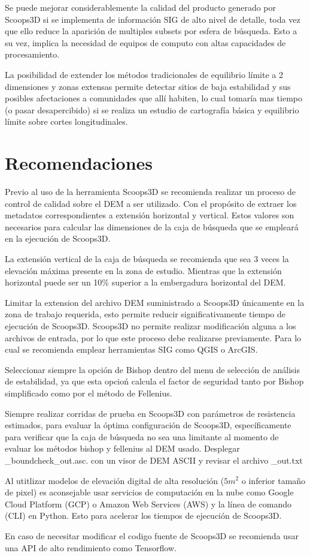 Se puede mejorar considerablemente la calidad del producto generado por Scoops3D si se implementa de informaci\'on SIG de alto nivel de detalle, toda vez que ello reduce la aparici\'on de multiples subsets por esfera de b\'usqueda. Esto a su vez, implica la necesidad de equipos de computo con altas capacidades de procesamiento.


La posibilidad de extender los m\'etodos tradicionales de equilibrio l\'imite a 2 dimensiones y zonas extensas permite detectar sitios de baja estabilidad y sus posibles afectaciones a comunidades que all\'i habiten, lo cual tomar\'ia mas tiempo (o pasar desapercibido) si se realiza un estudio de cartograf\'ia b\'asica y equilibrio l\'imite sobre cortes longitudinales.


\section{Recomendaciones}

Previo al uso de la herramienta Scoops3D se recomienda  realizar un proceso de control de calidad sobre el DEM a ser utilizado. Con el prop\'osito de extraer los metadatos correspondientes a extensi\'on horizontal y vertical. Estos valores son necesarios para calcular las dimensiones de la caja de b\'usqueda que se emplear\'a en la ejecuci\'on de Scoops3D.

La extensi\'on vertical de la caja de b\'usqueda se recomienda que sea 3 veces la elevaci\'on m\'axima presente en la zona de estudio. Mientras que la extensi\'on horizontal puede ser un 10\% superior a la embergadura horizontal del DEM.
  
Limitar la extension del archivo DEM suministrado a  Scoops3D \'unicamente en la zona de trabajo requerida, esto permite reducir significativamente tiempo de ejecuci\'on de Scoops3D. Scoops3D no permite realizar modificaci\'on alguna a los archivos de entrada, por lo que este proceso debe realizarse previamente. Para lo cual se recomienda emplear herramientas SIG como QGIS o ArcGIS.


Seleccionar siempre la opci\'on de Bishop dentro del menu de selecci\'on de an\'alisis de estabilidad, ya que esta opcio\'n calcula el factor de seguridad tanto por Bishop simplificado como por el m\'etodo de Fellenius.

Siempre realizar corridas de prueba en Scoops3D con par\'ametros de resistencia estimados, para evaluar la \'optima configuraci\'on de Scoops3D, espec\'ificamente para verificar que la caja de b\'usqueda no sea una limitante al momento de evaluar los m\'etodos bishop y fellenius al DEM usado. Desplegar \_boundcheck\_out.asc. con un visor de DEM ASCII y revisar el archivo \_out.txt



Al utitlizar modelos de elevaci\'on digital de alta resoluci\'on ($5m^{2}$ o inferior tama\~no de pixel) es aconsejable usar servicios de computaci\'on en la nube como Google Cloud Platform (GCP) o Amazon Web Services (AWS) y la l\'inea de comando (CLI) en Python. Esto para acelerar los tiempos de ejecuci\'on de Scoops3D.

En caso de necesitar modificar el codigo fuente de Scoops3D se recomienda usar una API de alto rendimiento como Tensorflow.


